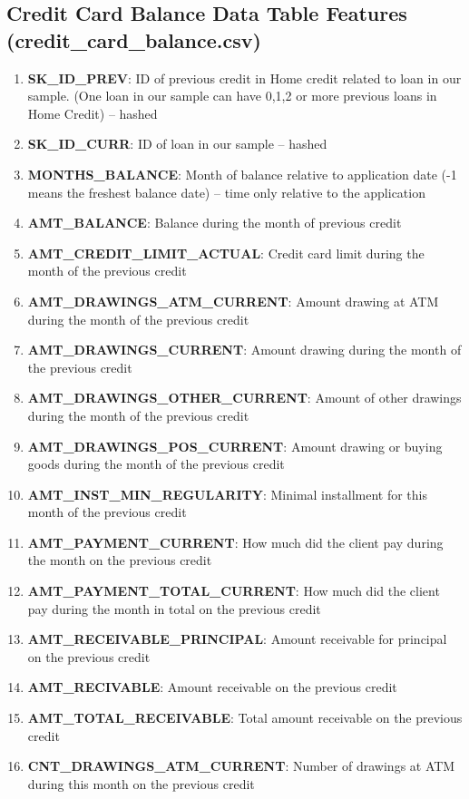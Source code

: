 \documentclass[12pt, letterpaper]{article}
\begin{document}
\begin{appendices}
\subsection{Credit Card Balance Data Table Features (credit_card_balance.csv)}
\begin{enumerate}
  \item \textbf{SK_ID_PREV}: ID of previous credit in Home credit related to loan in our sample. (One loan in our sample can have 0,1,2 or more previous loans in Home Credit) -- hashed
  \item \textbf{SK_ID_CURR}: ID of loan in our sample -- hashed
  \item \textbf{MONTHS_BALANCE}: Month of balance relative to application date (-1 means the freshest balance date) -- time only relative to the application
  \item \textbf{AMT_BALANCE}: Balance during the month of previous credit
  \item \textbf{AMT_CREDIT_LIMIT_ACTUAL}: Credit card limit during the month of the previous credit
  \item \textbf{AMT_DRAWINGS_ATM_CURRENT}: Amount drawing at ATM during the month of the previous credit
  \item \textbf{AMT_DRAWINGS_CURRENT}: Amount drawing during the month of the previous credit
  \item \textbf{AMT_DRAWINGS_OTHER_CURRENT}: Amount of other drawings during the month of the previous credit
  \item \textbf{AMT_DRAWINGS_POS_CURRENT}: Amount drawing or buying goods during the month of the previous credit
  \item \textbf{AMT_INST_MIN_REGULARITY}: Minimal installment for this month of the previous credit
  \item \textbf{AMT_PAYMENT_CURRENT}: How much did the client pay during the month on the previous credit
  \item \textbf{AMT_PAYMENT_TOTAL_CURRENT}: How much did the client pay during the month in total on the previous credit
  \item \textbf{AMT_RECEIVABLE_PRINCIPAL}: Amount receivable for principal on the previous credit
  \item \textbf{AMT_RECIVABLE}: Amount receivable on the previous credit
  \item \textbf{AMT_TOTAL_RECEIVABLE}: Total amount receivable on the previous credit
  \item \textbf{CNT_DRAWINGS_ATM_CURRENT}: Number of drawings at ATM during this month on the previous credit

\end{enumerate}
\end{appendices}
\end{document}
